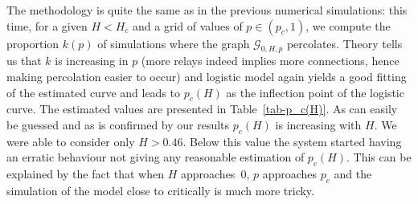 \documentclass[conference]{IEEEtran}
\begin{document}
The methodology is quite the same as in the previous numerical simulations: this time, for a given $H<H_c$ and a grid of values of $p \in (p_c,1)$, we compute the proportion $k(p)$ of simulations where the graph $\mathcal{G}_{0,H,p}$ percolates. Theory tells us that $k$ is increasing in $p$ (more relays indeed implies more connections, hence making percolation easier to occur) and logistic model again yields a good fitting of the estimated curve and leads to $p_c(H)$ as the inflection point of the logistic curve. The estimated values are presented in Table~\ref{tab-p_c(H)}. As can easily be guessed and as is confirmed by our results $p_c(H)$ is increasing with $H$.
We were able to consider only  $H>0.46$. Below this value 
the system started having an erratic behaviour not giving any  
reasonable estimation of $p_{c}(H)$. This can be explained by the  fact
that when $H$ approaches~0, $p$ approaches $p_{c}$ and the simulation of the model close to critically is much more tricky.
\end{document}
